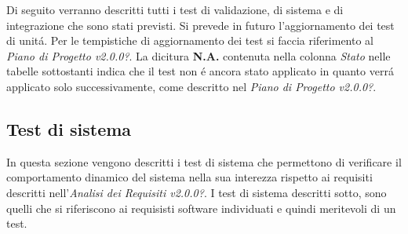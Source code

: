 Di seguito verranno descritti tutti i test di validazione, di sistema e di integrazione che sono stati previsti. Si prevede in futuro l'aggiornamento dei test di unit\'a. Per le tempistiche di aggiornamento dei test si faccia riferimento al \textit{Piano di Progetto v2.0.0?}. La dicitura \textbf{N.A.} contenuta nella colonna \textit{Stato} nelle tabelle sottostanti indica che il test non \'e ancora stato applicato in quanto verr\'a applicato solo successivamente, come descritto nel \textit{Piano di Progetto v2.0.0?}.


\subsection{Test di sistema}
In questa sezione vengono descritti i test di sistema che permettono di verificare il comportamento dinamico del sistema nella sua interezza rispetto ai requisiti descritti nell'\textit{Analisi dei Requisiti v2.0.0?}.
I test di sistema descritti sotto, sono quelli che si riferiscono ai requisisti software individuati e quindi meritevoli di un test.

